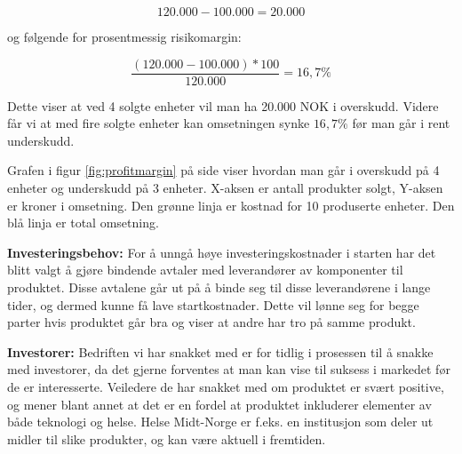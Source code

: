 $$ 120.000 - 100.000 = 20.000$$

og følgende for prosentmessig risikomargin:

$$ \frac{(120.000 - 100.000) * 100}{120.000} = 16,7 \% $$

Dette viser at ved 4 solgte enheter vil man ha 20.000 NOK i overskudd. Videre får vi at med fire solgte enheter kan omsetningen synke $16,7 \%$ før man går i rent underskudd.

Grafen i figur \ref{fig:profitmargin} på side \pageref{fig:profitmargin} viser hvordan man går i overskudd på 4 enheter og underskudd på 3 enheter. X-aksen er antall produkter solgt, Y-aksen er kroner i omsetning. Den grønne linja er kostnad for 10 produserte enheter. Den blå linja er total omsetning.

\textbf{Investeringsbehov:}
For å unngå høye investeringskostnader i starten har det blitt valgt å gjøre bindende avtaler med leverandører av komponenter til produktet. Disse avtalene går ut på å binde seg til disse leverandørene i lange tider, og dermed kunne få lave startkostnader. Dette vil lønne seg for begge parter hvis produktet går bra og viser at andre har tro på samme produkt.

\textbf{Investorer:}
Bedriften vi har snakket med er for tidlig i prosessen til å snakke med investorer, da det gjerne forventes at man kan vise til suksess i markedet før de er interesserte.
Veiledere de har snakket med om produktet er svært positive, og mener blant annet at det er en fordel at produktet inkluderer elementer av både teknologi og helse. Helse Midt-Norge er f.eks. en institusjon som deler ut midler til slike produkter, og kan være aktuell i fremtiden.
